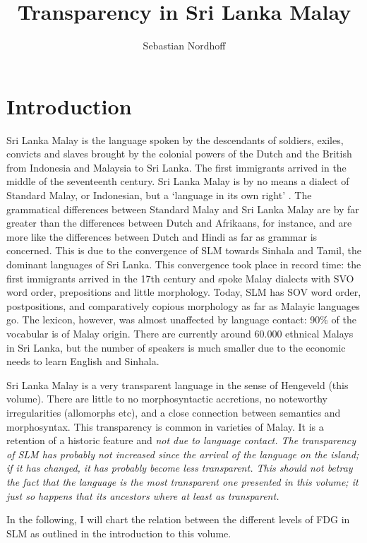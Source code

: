 \documentclass[a4paper]{article}
\title{Transparency in Sri Lanka Malay}
\author{Sebastian Nordhoff}
\begin{document}
\maketitle
 
 
\section{Introduction}
Sri Lanka Malay is the language spoken by the descendants of soldiers, exiles, convicts and slaves brought by the colonial powers of the Dutch and the British from Indonesia and Malaysia to Sri Lanka. The first immigrants arrived in the middle of the seventeenth century. Sri Lanka Malay is by no means a dialect of Standard Malay, or Indonesian, but a `language in its own right' \citep{Adelaar1991}. The grammatical differences between Standard Malay and Sri Lanka Malay are by far greater than the differences between Dutch and Afrikaans, for instance,  and are more like the differences between Dutch and Hindi as far as grammar is concerned. This is due to the convergence of SLM towards Sinhala and Tamil, the dominant languages of Sri Lanka. This convergence took place in record time: the first immigrants arrived in the 17th century and spoke Malay dialects with SVO word order, prepositions and little morphology. Today, SLM has SOV word order, postpositions, and comparatively copious morphology as far as Malayic languages go.
The lexicon, however, was almost unaffected by language contact: 90\% of the vocabular is of Malay origin. There are currently around 60.000 ethnical Malays in Sri Lanka, but the number of speakers is much smaller due to the economic needs to learn English and Sinhala.

Sri Lanka Malay is a very transparent language in the sense of Hengeveld (this volume). There are little to no morphosyntactic accretions, no noteworthy irregularities (allomorphs etc), and a close connection between semantics and morphosyntax. This transparency is common in varieties of Malay. It is a retention of a historic feature and \em not \em due to language contact. The transparency of SLM has probably not increased since the arrival of the language on the island; if it has changed, it has probably become less transparent. This should not betray the fact that the language is the most transparent one presented in this volume; it just so happens that its ancestors where at least as transparent.

In the following, I will chart the relation between the different levels of FDG \citep{HengeveldEtAl2008fdg} in SLM as outlined in the introduction to this volume.
\end{document}
